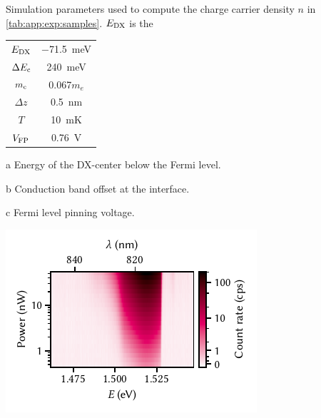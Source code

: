 \begin{margintable}
    \centering
    \footnotesize
    \begin{threeparttable}
        \caption{
            Simulation parameters used to compute the charge carrier density $n$ in \cref{tab:app:exp:samples}.
            $E_{\mathrm{DX}}$ is the
        }
        \label{tab:app:exp:samples:ps}
        \begin{tabularx}{2cm}{c c}
            \toprule
            $E_{\mathrm{DX}}$\tnote{a}          & \qty{-71.5}{meV} \\
            $\Delta E_{\mathrm{c}}$\tnote{b}    & \qty{240}{meV} \\
            $m_{\mathrm{c}}$                    & \num{0.067}{$m_e$} \\
            $\Delta z$                      & \qty{0.5}{nm} \\
            $T$                             & \qty{10}{mK} \\
            $V_{\mathrm{FP}}$\tnote{c}          & \qty{0.76}{V} \\
            \bottomrule
        \end{tabularx}
        \begin{tablenotes}
            \scriptsize
            \item[a] Energy of the DX-center below the Fermi level.
            \item[b] Conduction band offset at the  interface.
            \item[c] Fermi level pinning voltage.
        \end{tablenotes}
    \end{threeparttable}
\end{margintable}
%

\begin{marginfigure}
    \centering
    \includegraphics{img/pdf/experiment/2deg_pl_power_dependence}
    \caption[
        \protect\newline
    ]{}
    \label{fig:app:exp:observations:2deg_pl_power_dependence}
\end{marginfigure}

